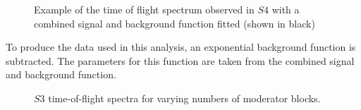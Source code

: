 	\begin{figure}[h]
		\begin{adjustbox}{max totalsize={.7\textwidth}{.62\textheight},center}
			
		\end{adjustbox}
		\caption{Example of the time of flight spectrum observed in $S4$ with a combined signal and background function fitted (shown in black)}
		\label{fig:fitEx}
	\end{figure}

	To produce the data used in this analysis, an exponential background function is subtracted. 
	The parameters for this function are taken from the combined signal and background function.

	\begin{figure}[h]
		\begin{adjustbox}{max totalsize={.8\textwidth}{.5\textheight},center}
			
		\end{adjustbox}
		\caption{$S3$ time-of-flight spectra for varying numbers of moderator blocks.}
		\label{fig:s3tof}
	\end{figure}
	